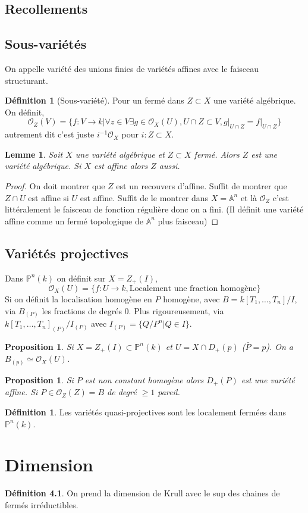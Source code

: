\documentclass[a4paper,12pt]{book}
\newcommand{\A}{\mathbb{A}}
\newcommand{\Or}{\mathcal{O}}
\renewcommand{\P}{\mathbb{P}}
\theoremstyle{plain}
\newtheorem{lem}[subsection]{Lemme}
\newtheorem{prop}[subsection]{Proposition}
\theoremstyle{definition}
\newtheorem{defn}[subsection]{Définition}
\theoremstyle{remark}
\begin{document}
\section{Recollements}
\section{Sous-variétés}
On appelle variété des unions finies de variétés affines avec le 
faisceau structurant.

\begin{defn}[Sous-variété]
    Pour un fermé dans $Z\subset X$ une variété algébrique. On définit,
    \[\Or_Z(V)=\{f\colon V\to k|\forall z\in V \exists g\in \Or_X(U),
    U\cap Z\subset V,g|_{U\cap Z}=f|_{U\cap Z}\}\]
    autrement dit c'est juste $i^{-1}\Or_X$ pour $i\colon Z\subset X$.
\end{defn}

\begin{lem}
    Soit $X$ une variété algébrique et $Z\subset X$ fermé. Alors
    $Z$ est une variété algébrique. Si $X$ est affine alors $Z$ aussi.
\end{lem}
\begin{proof}
    On doit montrer que $Z$ est un recouvers d'affine. Suffit de 
    montrer que $Z\cap U$ est affine si $U$ est affine. Suffit de
    le montrer dans $X=\A^n$ et là $\Or_Z$ c'est littéralement
    le faisceau de fonction régulière donc on a fini. (Il définit une
    variété affine comme un fermé topologique de $\A^n$ plus faisceau)
\end{proof}


\section{Variétés projectives}
Dans $\P^n(k)$ on définit sur $X=Z_+(I)$, \[\Or_X(U)=\{f\colon U\to k,
\textrm{Localement une fraction homogène}\}\]
Si on définit la localisation homogène en $P$ homogène, avec $B=k[T_1,
\ldots,T_n]/I$, via $B_{(P)}$ les fractions de degrés $0$. Plus
rigoureusement, via $k[T_1,\ldots, T_n]_{(P)}/I_{(P)}$ avec $I_{(P)}=
\{Q/P^n|Q\in I\}$.
\begin{prop}
    Si $X=Z_+(I)\subset \P^n(k)$ et $U=X\cap D_+(p)$ ($\bar P=p$). On a
    $B_{(p)}\simeq \Or_X(U)$.
\end{prop}

\begin{prop}
    Si $P$ est non constant homogène alors $D_+(P)$ est une variété 
    affine. Si $P\in \Or_Z(Z)=B$ de degré $\geq 1$ pareil.
\end{prop}

\begin{defn}
    Les variétés quasi-projectives sont les localement fermées dans
    $\P^n(k)$.
\end{defn}
\chapter{Dimension}
\begin{defn}
    On prend la dimension de Krull avec le sup des chaines de fermés
    irréductibles.
\end{defn}

\printbibliography
\end{document}
